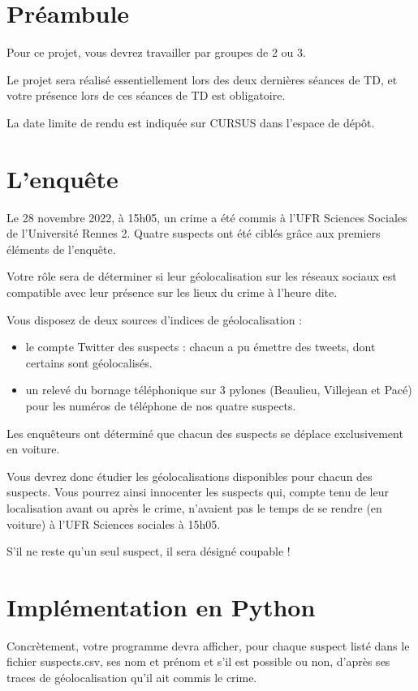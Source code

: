 \documentclass[11pt,a4paper]{article}
\begin{document}
\section{Préambule}

Pour ce projet, vous devrez travailler par groupes de 2 ou 3.

Le projet sera réalisé essentiellement lors des deux dernières séances de TD, et votre présence lors de ces séances de TD est obligatoire.

La date limite de rendu est indiquée sur CURSUS dans l’espace de dépôt.


\section{L'enquête}

Le 28 novembre 2022, à 15h05, un crime a été commis à l’UFR Sciences Sociales de l’Université Rennes 2. Quatre suspects ont été ciblés grâce aux premiers éléments de l’enquête. 

Votre rôle sera de déterminer si leur géolocalisation sur les réseaux sociaux est compatible avec leur présence sur les lieux du crime à l’heure dite.

Vous disposez de deux sources d'indices de géolocalisation : 
\begin{itemize}
    \item le compte Twitter des suspects : chacun a pu émettre des tweets, dont certains sont géolocalisés. 
    \item un relevé du bornage téléphonique sur 3 pylones (Beaulieu, Villejean et Pacé) pour les numéros de téléphone de nos quatre suspects.
\end{itemize}

Les enquêteurs ont déterminé que chacun des suspects se déplace exclusivement en voiture. 

Vous devrez donc étudier les géolocalisations disponibles pour chacun des suspects. Vous pourrez ainsi innocenter les suspects qui, compte tenu de leur localisation avant ou après le crime, n'avaient pas le temps de se rendre (en voiture) à l'UFR Sciences sociales à 15h05. 

S'il ne reste qu'un seul suspect, il sera désigné coupable !

\section{Implémentation en Python}

Concrètement, votre programme devra afficher, pour chaque suspect listé dans le fichier suspects.csv, ses nom et prénom et s’il est possible ou non, d’après ses traces de géolocalisation qu’il ait commis le crime.
\end{document}
